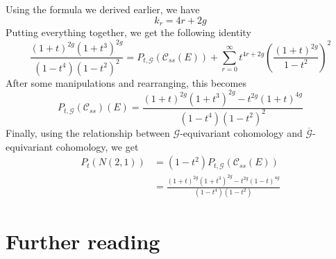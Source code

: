 Using the formula we derived earlier, we have
\[
k_r = 4r + 2g
\]
Putting everything together, we get the following identity
\[
\frac{(1+t)^{2g}(1+t^3)^{2g}}{(1-t^4)(1-t^2)^2} = P_{t,\mathscr{G}}(\mathscr{C}_{ss}(E))
+ \sum_{r=0}^\infty t^{4r+2g}\left(\frac{(1+t)^{2g}}{1-t^2}\right)^2
\]
After some manipulations and rearranging, this becomes
\[
P_{t, \mathscr{G}}(\mathscr{C}_{ss})(E)
= \frac{(1+t)^{2g}(1+t^3)^{2g}-t^{2g}(1+t)^{4g}}{(1-t^4)(1-t^2)^2}
\]
Finally, using the relationship between $\mathscr{G}$-equivariant cohomology
and $\overline{\mathscr{G}}$-equivariant cohomology, we get
\begin{align*}
P_t(N(2,1)) &= (1-t^2)P_{t,\mathscr{G}}(\mathscr{C}_{ss}(E)) \\
&= \frac{(1+t)^{2g}(1+t^3)^{2g} - t^{2g}(1-t)^{4g}}{(1-t^4)(1-t^2)}
\end{align*}
%
\section{Further reading}
%